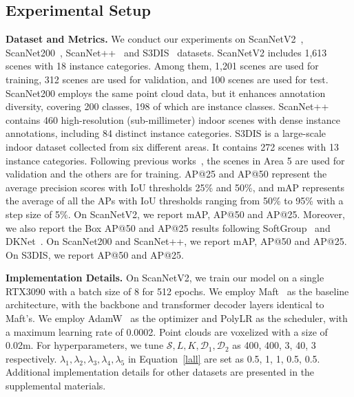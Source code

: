 \subsection{Experimental Setup}
\textbf{Dataset and Metrics.}
We conduct our experiments on ScanNetV2~\cite{dai2017scannet}, ScanNet200~\cite{rozenberszki2022language}, ScanNet++~\cite{yeshwanth2023scannet++} and S3DIS~\cite{armeni20163d} datasets.
%
ScanNetV2 includes 1,613 scenes with 18 instance categories.
%
Among them, 1,201 scenes are used for training, 312 scenes are used for validation, and 100 scenes are used for test. ScanNet200 employs the same point cloud data, but it enhances annotation diversity, covering 200 classes, 198 of which are instance classes. ScanNet++ contains 460 high-resolution (sub-millimeter) indoor scenes with dense instance annotations, including 84 distinct instance categories.
%
S3DIS is a large-scale indoor dataset collected from six different areas.
%
It contains 272 scenes with 13 instance categories.
%
Following previous works~\cite{lai2023mask}, the scenes in Area 5 are used for
validation and the others are for training.
%
AP@25 and AP@50 represent the average precision scores with IoU thresholds 25\% and 50\%,
%
and mAP represents the average of all the APs with IoU thresholds ranging from 50\% to 95\% with a step size of 5\%.
%
On ScanNetV2, we report mAP, AP@50 and AP@25.
%
Moreover, we also report the Box AP@50 and AP@25 results following SoftGroup~\cite{vu2022softgroup} and DKNet~\cite{wu20223d}.
%
On ScanNet200 and ScanNet++, we report mAP, AP@50 and AP@25.
%
On S3DIS, we report AP@50 and AP@25.

\textbf{Implementation Details.}
\label{Implementation}
On ScanNetV2, we train our model on a single RTX3090 with a batch size of 8 for 512 epochs. We employ Maft~\cite{lai2023mask} as the baseline architecture, with the backbone and transformer decoder layers identical to Maft's.
%
We employ AdamW~\cite{loshchilov2017decoupled} as the optimizer and PolyLR as the scheduler, with a maximum learning rate of 0.0002.
%
Point clouds are voxelized with a size of 0.02m.
%
For hyperparameters, we tune $\mathcal{S}, L, K, \mathcal{D}_1, \mathcal{D}_2$ as 400, 400, 3, 40, 3 respectively.
$\lambda_1 ,\lambda_2 ,\lambda_3 ,\lambda_4 ,\lambda_5$ in Equation~\ref{lall} are set as 0.5, 1, 1, 0.5, 0.5.
%
Additional implementation details for other datasets are presented in the supplemental materials.
